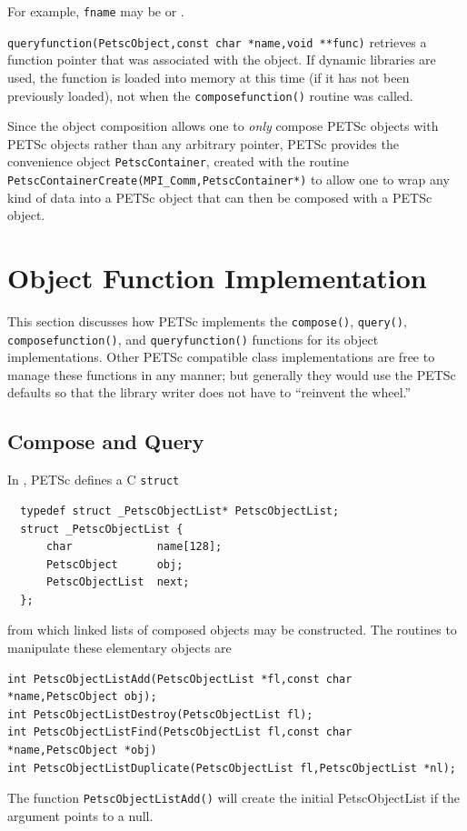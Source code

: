 \begin{tightitemize}
      For example, \lstinline{fname} may be  or
      .

\item \lstinline{queryfunction(PetscObject,const char *name,void **func)} retrieves a function pointer that
      was associated with the object. If dynamic libraries are used, the function is loaded
      into memory at this time (if it has not been previously loaded), not when the
      \lstinline{composefunction()} routine was called.

\end{tightitemize}

Since the object composition allows one to {\em only} compose PETSc objects
with PETSc objects rather than any arbitrary pointer, PETSc provides
the convenience object \lstinline{PetscContainer}, created with the
routine \lstinline{PetscContainerCreate(MPI_Comm,PetscContainer*)}
to allow one to wrap any kind of data into a PETSc object that can then be
composed with a PETSc object.

\section{Object Function Implementation}

This section discusses how PETSc implements the \lstinline{compose()}, \lstinline{query()}, 
\lstinline{composefunction()}, and \lstinline{queryfunction()} functions for its object implementations.
Other PETSc compatible class implementations are free to manage these functions in any
manner; but generally they would use the PETSc defaults so that the library writer does
not have to ``reinvent the wheel.''

\subsection{Compose and Query}
In \href{http://www.mcs.anl.gov/petsc/petsc-master/src/objects/olist.c.html}{}, PETSc defines a C \lstinline{struct}
\begin{lstlisting}
  typedef struct _PetscObjectList* PetscObjectList;
  struct _PetscObjectList {
      char             name[128];
      PetscObject      obj;
      PetscObjectList  next;
  };
\end{lstlisting}
from which linked lists of composed objects may be constructed. The routines
to manipulate these elementary objects are
\begin{lstlisting}
int PetscObjectListAdd(PetscObjectList *fl,const char *name,PetscObject obj);
int PetscObjectListDestroy(PetscObjectList fl);
int PetscObjectListFind(PetscObjectList fl,const char *name,PetscObject *obj)
int PetscObjectListDuplicate(PetscObjectList fl,PetscObjectList *nl);
\end{lstlisting}
The function \lstinline{PetscObjectListAdd()} will create the initial PetscObjectList if the argument
 points to a null.

